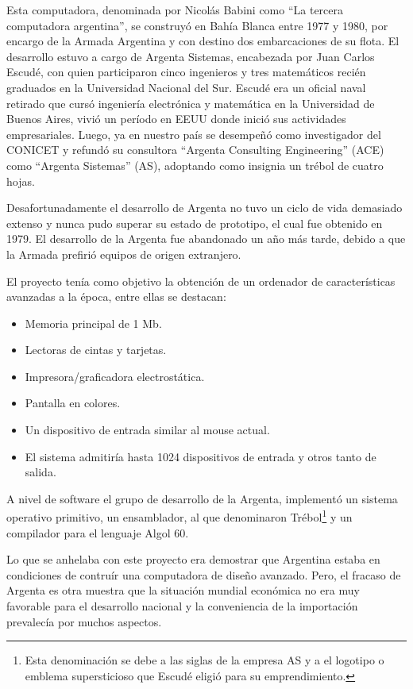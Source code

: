 \documentclass[%
  	final,
%
	notitlepage,
	narroweqnarray,
	inline,
 	twoside,
	]{ieee}
\begin{document}
Esta computadora, denominada por Nicol\'as Babini\cite{babini2} como ``La tercera computadora argentina'', se construy\'o en Bah\'ia Blanca entre 1977 y 1980, por encargo de la Armada Argentina y con destino dos embarcaciones de su flota. El desarrollo estuvo a cargo de Argenta Sistemas, encabezada por Juan Carlos Escud\'e, con quien participaron cinco ingenieros y tres matem\'aticos reci\'en graduados en la Universidad Nacional del Sur. 
Escud\'e era un oficial naval retirado que curs\'o ingenier\'ia electr\'onica y matem\'atica en la Universidad de Buenos Aires, vivi\'o un per\'iodo en EEUU donde inici\'o sus actividades empresariales. Luego, ya en nuestro pa\'is se desempe\~n\'o como investigador del CONICET y refund\'o su consultora ``Argenta Consulting Engineering'' (ACE) como ``Argenta Sistemas'' (AS), adoptando como insignia un tr\'ebol de cuatro hojas.

Desafortunadamente el desarrollo de Argenta no tuvo un ciclo de vida demasiado extenso y nunca pudo superar su estado de prototipo, el cual fue obtenido en 1979. El desarrollo de la Argenta fue abandonado un a\~no m\'as tarde, debido a que la Armada prefiri\'o equipos de origen extranjero. 

El proyecto ten\'ia como objetivo la obtenci\'on de un ordenador de caracter\'isticas avanzadas a la \'epoca, entre ellas se destacan:\\

\begin{itemize}
\item Memoria principal de 1 Mb.
\item Lectoras de cintas y tarjetas.
\item Impresora/graficadora electrost\'atica.
\item Pantalla en colores. 
\item Un dispositivo de entrada similar al mouse actual. 
\item El sistema admitir\'ia hasta 1024 dispositivos de entrada y otros tanto de salida.\\
\end{itemize}

A nivel de software el grupo de desarrollo de la Argenta, implement\'o un sistema operativo primitivo, un ensamblador, al que denominaron Tr\'ebol\footnote{Esta denominaci\'on se debe a las siglas de la empresa AS y a el logotipo o emblema supersticioso que Escud\'e eligi\'o para su emprendimiento.} y un compilador para el lenguaje Algol 60.

Lo que se anhelaba con este proyecto era demostrar que Argentina estaba en condiciones de contru\'ir una computadora de dise\~no avanzado. Pero, el fracaso de Argenta es otra muestra que la situaci\'on mundial econ\'omica no era muy favorable para el desarrollo nacional y la conveniencia de la importaci\'on prevalec\'ia por muchos aspectos.
\end{document}
